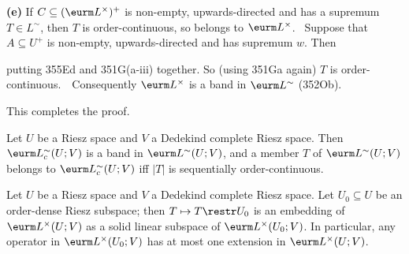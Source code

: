 {

\medskip

{\bf (e)} If $C\subseteq(\eurm L^{\times})^+$ is non-empty,
upwards-directed and has a supremum $T\in L^{\sim}$, then $T$ is
order-continuous, so belongs to $\eurm L^{\times}$.   \Prf\ Suppose that
$A\subseteq U^+$ is non-empty, upwards-directed and has supremum $w$.
Then


\noindent putting 355Ed and 351G(a-iii) together.   So (using 351Ga
again) $T$ is order-continuous.\ \QeD\  Consequently $\eurm L^{\times}$
is a band in $\eurm L^{\sim}$ (352Ob).

This completes the proof.
}%

 Let $U$ be a Riesz space and $V$ a Dedekind
complete Riesz space.   Then $\eurm L^{\sim}_c(U;V)$ is a band in
$\eurm L^{\sim}(U;V)$, and a member $T$ of $\eurm L^{\sim}(U;V)$ belongs to
$\eurm L^{\sim}_c(U;V)$ iff $|T|$ is sequentially order-continuous.


 Let $U$ be a Riesz space and $V$ a Dedekind
complete Riesz space.   Let $U_0\subseteq U$ be an order-dense Riesz
subspace;  then $T\mapsto T\restr U_0$ is an embedding of
$\eurm L^{\times}(U;V)$ as a solid linear subspace of
$\eurm L^{\times}(U_0;V)$.   In particular, any operator in
$\eurm L^{\times}(U_0;V)$
has at most one extension in $\eurm L^{\times}(U;V)$.

